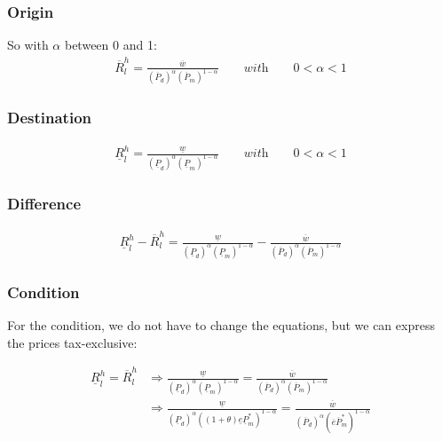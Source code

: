 \subsubsection*{Origin}
So with $\alpha$ between 0 and 1:
\begin{equation}\label{conw.o}
\begin{aligned}
\overline R^{h}_l = \frac{\overline w}{ \left( \overline P_{d} \right) ^{\alpha}  \left( \overline P_m \right) ^{1-\alpha}} \qquad \textit{with} \qquad 0 < \alpha < 1 \end{aligned}  \end{equation}

\subsubsection*{Destination}
\begin{equation}\label{conw.d}
\begin{aligned}
\underline R^{h}_l = \frac{\underline w}{ \left( \underline P_{d} \right) ^{\alpha}  \left( \underline P_m \right) ^{1-\alpha}}\qquad \textit{with} \qquad 0 < \alpha < 1 \end{aligned}  \end{equation}

\subsubsection*{Difference}
\begin{equation}\label{conw.diff}
\begin{aligned}
\underline R^{h}_l - \overline R^{h}_l = \frac{\underline w}{ \left( \underline P_{d} \right) ^{\alpha}  \left( \underline P_m \right) ^{1-\alpha}} - \frac{\overline w}{ \left( \overline P_{d} \right) ^{\alpha}  \left( \overline P_m \right) ^{1-\alpha}}\end{aligned}  \end{equation}

\subsubsection*{Condition}
For the condition, we do not have to change the equations, but we can express the prices tax-exclusive:

\begin{equation}\label{conw.con}
\begin{aligned}
\underline R^{h}_l = \overline R^{h}_l &\Rightarrow \frac{\underline w}{ \left( \underline P_{d} \right) ^{\alpha}  \left( \underline P_m \right) ^{1-\alpha}} = \frac{\overline w}{ \left( \overline P_{d} \right) ^{\alpha}  \left( \overline P_m \right) ^{1-\alpha}} \\ &\Rightarrow \frac{\underline w}{ \left( \underline P_{d} \right) ^{\alpha}  \left( (1+\theta) \underline e  \underline P_m^* \right) ^{1-\alpha}} = \frac{\overline w}{ \left( \overline P_{d} \right) ^{\alpha}  ( \overline e \overline P_m^* ) ^{1-\alpha}}
\end{aligned}  
\end{equation}

